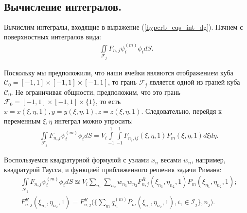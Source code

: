 \documentclass[14pt, a4paper, fleqn]{extreport}
\begin{document}
    \subsection{Вычисление интегралов.}
    
    Вычислим интегралы, входящие в выражение (\ref{hyperb_eqs_int_dg}).
    Начнем с поверхностных интегралов вида:
    \begin{equation*}
    \begin{split}
        \iint\limits_{\mathcal{F}_j} F_{n,j} \psi_i^{(m)} \phi_i dS.
    \end{split}
    \end{equation*}
    
    Поскольку мы предположили, что наши ячейки являются отображением 
    куба $\mathcal{C}_0 = [-1,1] \times [-1,1] \times [-1,1]$,
    то грань $\mathcal{F}_j$ является одной из граней куба $\mathcal{C}_0$.
    Не ограничивая общности, предположим, что это 
    грань $\mathcal{F}_0 = [-1,1] \times [-1,1] \times \lbrace 1 \rbrace$,
    то есть $x=x(\xi,\eta,1),y=y(\xi,\eta,1),z=z(\xi,\eta,1)$.
    Следовательно, перейдя к переменным $\xi,\eta$ интеграл можно упросить:
    \begin{equation*}
    \begin{split}
        &\iint\limits_{\mathcal{F}_j} F_{n,j} \psi_i^{(m)} \phi_i dS 
            = V_i \int\limits_{-1}^{1} \int\limits_{-1}^{1} 
                F_{n_j,ij}(\xi,\eta,1)P_m(\xi,\eta,1)d\xi d\eta.
    \end{split}
    \end{equation*}
    
    Воспользуемся квадратурной формулой с узлами $x_n$ весами $w_n$,
    например, квадратурой Гаусса, и функцией приближенного решения задачи Римана:
    \begin{equation*}
    \begin{split}
        &\iint\limits_{\mathcal{F}_j} F_{n,j} \psi_i^{(m)} \phi_i dS
            \approxeq V_i \sum\limits_{n_1} 
                \sum\limits_{n_2} w_{n_1} w_{n_2} 
                    F_{n,j}^R(\xi_{n_1},\eta_{n_2},1) P_m(\xi_{n_1},\eta_{n_2},1); \\
        &F_{n,j}^R(\xi_{n_1},\eta_{n_2},1) 
            = F_{n,j}^R \Big( \Big\lbrace \sum\limits_m q_{i_1}^{(m)} 
                P_m(\xi_{n_1},\eta_{n_2},1), i_1 \in \mathcal{I}_j \Big\rbrace, n_{j} \Big).
    \end{split}
    \end{equation*}
    
\end{document}
